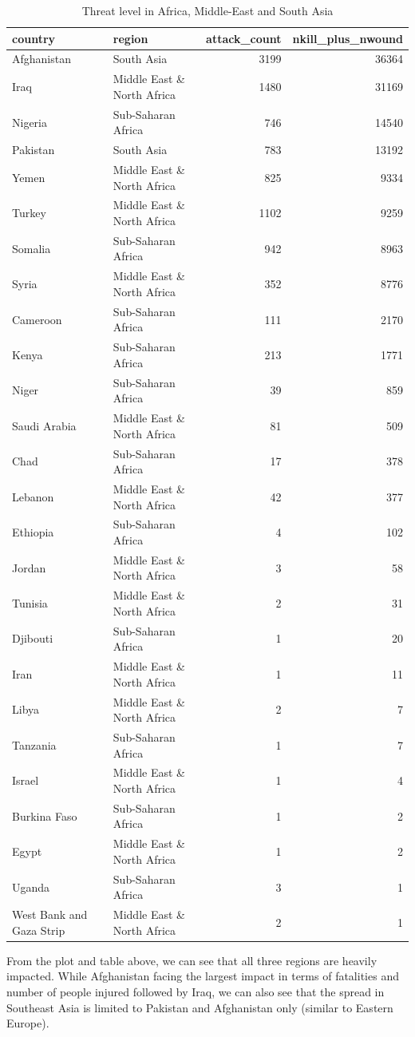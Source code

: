 \documentclass[11pt,oneside,a4paper]{reedthesis}
\begin{document}
\begin{table}[H]

\caption{\label{tab:unnamed-chunk-23}Threat level in Africa, Middle-East and South Asia}
\centering
\fontsize{9}{11}\selectfont
\begin{tabular}[t]{llrr}
\toprule
country & region & attack\_count & nkill\_plus\_nwound\\
\midrule
Afghanistan & South Asia & 3199 & 36364\\
Iraq & Middle East \& North Africa & 1480 & 31169\\
Nigeria & Sub-Saharan Africa & 746 & 14540\\
Pakistan & South Asia & 783 & 13192\\
Yemen & Middle East \& North Africa & 825 & 9334\\
\addlinespace
Turkey & Middle East \& North Africa & 1102 & 9259\\
Somalia & Sub-Saharan Africa & 942 & 8963\\
Syria & Middle East \& North Africa & 352 & 8776\\
Cameroon & Sub-Saharan Africa & 111 & 2170\\
Kenya & Sub-Saharan Africa & 213 & 1771\\
\addlinespace
Niger & Sub-Saharan Africa & 39 & 859\\
Saudi Arabia & Middle East \& North Africa & 81 & 509\\
Chad & Sub-Saharan Africa & 17 & 378\\
Lebanon & Middle East \& North Africa & 42 & 377\\
Ethiopia & Sub-Saharan Africa & 4 & 102\\
\addlinespace
Jordan & Middle East \& North Africa & 3 & 58\\
Tunisia & Middle East \& North Africa & 2 & 31\\
Djibouti & Sub-Saharan Africa & 1 & 20\\
Iran & Middle East \& North Africa & 1 & 11\\
Libya & Middle East \& North Africa & 2 & 7\\
\addlinespace
Tanzania & Sub-Saharan Africa & 1 & 7\\
Israel & Middle East \& North Africa & 1 & 4\\
Burkina Faso & Sub-Saharan Africa & 1 & 2\\
Egypt & Middle East \& North Africa & 1 & 2\\
Uganda & Sub-Saharan Africa & 3 & 1\\
West Bank and Gaza Strip & Middle East \& North Africa & 2 & 1\\
\bottomrule
\end{tabular}
\end{table}
From the plot and table above, we can see that all three regions are
heavily impacted. While Afghanistan facing the largest impact in terms
of fatalities and number of people injured followed by Iraq, we can also
see that the spread in Southeast Asia is limited to Pakistan and
Afghanistan only (similar to Eastern Europe).
\end{document}
